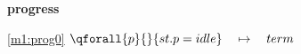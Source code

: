 \textbf{progress}
\begin{block}
\item[ \eqref{m1:prog0} ]{$\qforall{p}{}{st.p = idle}  \quad \mapsto\quad term $} %
\end{block}
